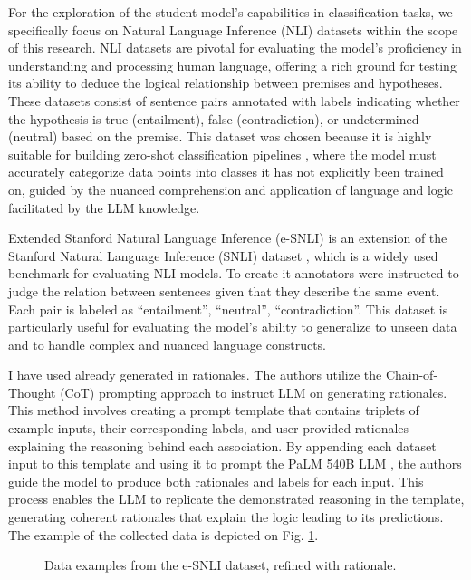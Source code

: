 For the exploration of the student model's capabilities in classification tasks, we specifically focus on Natural Language Inference (NLI) datasets within the scope of this research. NLI datasets are pivotal for evaluating the model's proficiency in understanding and processing human language, offering a rich ground for testing its ability to deduce the logical relationship between premises and hypotheses. These datasets consist of sentence pairs annotated with labels indicating whether the hypothesis is true (entailment), false (contradiction), or undetermined (neutral) based on the premise. This dataset was chosen because it is highly suitable for building zero-shot classification pipelines \cite{zeroshotclf}, where the model must accurately categorize data points into classes it has not explicitly been trained on, guided by the nuanced comprehension and application of language and logic facilitated by the LLM knowledge.

Extended Stanford Natural Language Inference (e-SNLI) \cite{esnli} is an extension of the Stanford Natural Language Inference (SNLI) dataset \cite{snli}, which is a widely used benchmark for evaluating NLI models. To create it annotators were instructed to judge the relation between sentences given that they describe the same event. Each pair is labeled as ``entailment'', ``neutral'', ``contradiction''. This dataset is particularly useful for evaluating the model's ability to generalize to unseen data and to handle complex and nuanced language constructs.

I have used already generated in \cite{stepbystep} rationales. The authors utilize the Chain-of-Thought (CoT) \cite{cot} prompting approach to instruct LLM on generating rationales. This method involves creating a prompt template that contains triplets of example inputs, their corresponding labels, and user-provided rationales explaining the reasoning behind each association. By appending each dataset input to this template and using it to prompt the PaLM 540B LLM \cite{palm}, the authors guide the model to produce both rationales and labels for each input. This process enables the LLM to replicate the demonstrated reasoning in the template, generating coherent rationales that explain the logic leading to its predictions. The example of the collected data is depicted on Fig. \ref{fig:rationale_dataset}.

\begin{figure}[hbt]
    \centering
    \begin{subfigure}[t]{.5\linewidth}
        \centering
        
    \end{subfigure}%
    \begin{subfigure}[t]{.5\linewidth}
        \centering
        
    \end{subfigure}

    \caption{Data examples from the e-SNLI dataset, refined with rationale.}
    \label{fig:rationale_dataset}
\end{figure}

